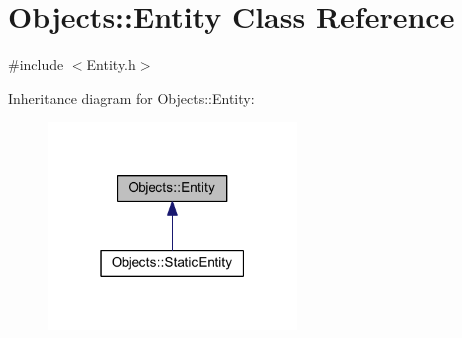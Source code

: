 \hypertarget{class_objects_1_1_entity}{}\section{Objects\+:\+:Entity Class Reference}
\label{class_objects_1_1_entity}


{\ttfamily \#include $<$Entity.\+h$>$}



Inheritance diagram for Objects\+:\+:Entity\+:
\nopagebreak
\begin{figure}[H]
\begin{center}
\leavevmode
\includegraphics[width=187pt]{class_objects_1_1_entity__inherit__graph}
\end{center}
\end{figure}
